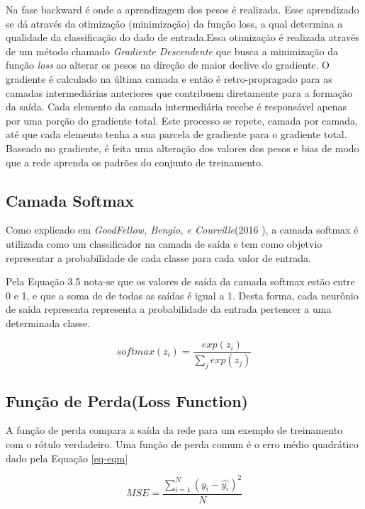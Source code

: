 Na fase backward é onde a aprendizagem dos pesos é realizada. Esse aprendizado se dá através da otimização (minimização) da função loss, a qual determina a qualidade da classificação do dado de entrada.Essa otimização é realizada através de um método chamado \textit{Gradiente Descendente} que busca a minimização da função \textit{loss} ao alterar os pesos na direção de maior declive do gradiente. O gradiente é calculado na última camada e então é retro-propragado para as camadas intermediárias anteriores que contribuem diretamente para a formação da saída. Cada elemento da camada intermediária recebe é responsável apenas por uma porção do gradiente total. Este processo se repete, camada por camada, até que cada elemento tenha a sua parcela de gradiente para o gradiente total. Baseado no gradiente, é feita uma alteração dos valores dos pesos e bias de modo que a rede aprenda os padrões do conjunto de treinamento.


\subsection{Camada Softmax}

Como explicado em \textit{GoodFellow, Bengio, e Courville}(2016 \cite{Goodfellow2016}), a camada softmax é utilizada como um classificador na camada de saída e tem como objetvio representar a probabilidade de cada classe para cada valor de entrada.

Pela Equação 3.5 nota-se que os valores de saída da camada softmax estão entre 0 e 1, e que a soma de de todas as saídas é igual a 1. Desta forma, cada neurônio de saída representa representa a probabilidade da entrada pertencer a uma determinada classe.

\begin{equation}
softmax(z_i) = \frac{exp(z_i)}{\sum_{j}^{} exp(z_j)}
\end{equation}

\subsection{Função de Perda(Loss Function)}
A função de perda compara a saída da rede para um exemplo de treinamento com o rótulo verdadeiro. Uma função de perda comum é o erro médio quadrático dado pela Equação \ref{eq-eqm}

\begin{equation} \label{eq-eqm}
MSE = 	\frac{ \sum_{i=1}^{N} (y_i - \hat{y_i})^2}{N}
\end{equation}

